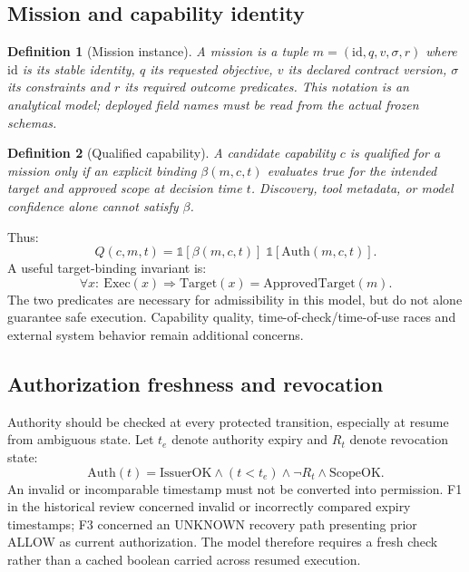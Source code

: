 \documentclass[11pt,twocolumn]{article}
\newtheorem{definition}{Definition}
\begin{document}
\subsection{Mission and capability identity}
\begin{definition}[Mission instance]
A mission is a tuple $m=(\mathrm{id},q,v,\sigma,r)$ where $\mathrm{id}$ is its stable identity, $q$ its requested objective, $v$ its declared contract version, $\sigma$ its constraints and $r$ its required outcome predicates. This notation is an analytical model; deployed field names must be read from the actual frozen schemas.
\end{definition}
\begin{definition}[Qualified capability]
A candidate capability $c$ is qualified for a mission only if an explicit binding $\beta(m,c,t)$ evaluates true for the intended target and approved scope at decision time $t$. Discovery, tool metadata, or model confidence alone cannot satisfy $\beta$.
\end{definition}
Thus:
\begin{equation}
Q(c,m,t)=\mathbb{1}[\beta(m,c,t)]\;\mathbb{1}[\mathrm{Auth}(m,c,t)].
\label{eq:qual}
\end{equation}
A useful target-binding invariant is:
\begin{equation}
\forall x:\ \mathrm{Exec}(x)\Rightarrow
\mathrm{Target}(x)=\mathrm{ApprovedTarget}(m).
\label{eq:target}
\end{equation}
The two predicates are necessary for admissibility in this model, but do not alone guarantee safe execution. Capability quality, time-of-check/time-of-use races and external system behavior remain additional concerns.

\subsection{Authorization freshness and revocation}
Authority should be checked at every protected transition, especially at resume from ambiguous state. Let $t_e$ denote authority expiry and $R_t$ denote revocation state:
\begin{equation}
\mathrm{Auth}(t)=\mathrm{IssuerOK}\land (t<t_e)\land\neg R_t\land\mathrm{ScopeOK}.
\label{eq:revocation}
\end{equation}
An invalid or incomparable timestamp must not be converted into permission. F1 in the historical review concerned invalid or incorrectly compared expiry timestamps; F3 concerned an UNKNOWN recovery path presenting prior ALLOW as current authorization. The model therefore requires a fresh check rather than a cached boolean carried across resumed execution.
\end{document}
